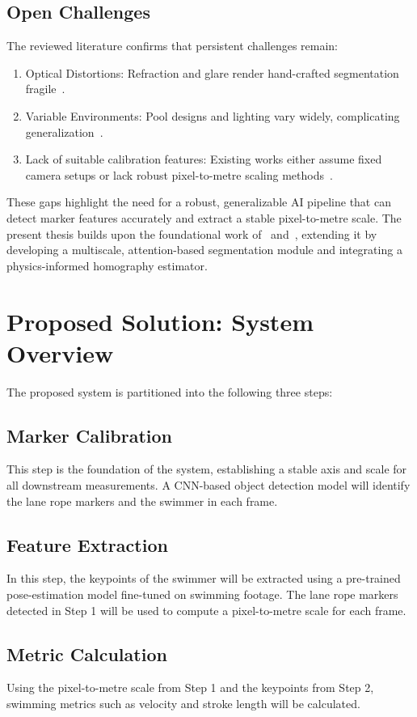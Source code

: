 \documentclass[conference]{IEEEtran}
\begin{document}
\subsection*{Open Challenges}
The reviewed literature confirms that persistent challenges remain:
\begin{enumerate}
    \item Optical Distortions: Refraction and glare render hand-crafted segmentation fragile~\cite{cao2024}.
    \item Variable Environments: Pool designs and lighting vary widely, complicating generalization~\cite{tran2024}.
    \item Lack of suitable calibration features: Existing works either assume fixed camera setups or lack robust pixel-to-metre scaling methods~\cite{tran2024, cao2024}.
\end{enumerate}

These gaps highlight the need for a robust, generalizable AI pipeline that can detect marker features accurately and extract a stable pixel-to-metre scale. The present thesis builds upon the foundational work of~\cite{tran2024} and~\cite{cao2024}, extending it by developing a multiscale, attention-based segmentation module and integrating a physics-informed homography estimator.


\section{Proposed Solution: System Overview}
The proposed system is partitioned into the following three steps:

\subsection{Marker Calibration}
This step is the foundation of the system, establishing a stable axis and scale for all downstream measurements. A CNN-based object detection model will identify the lane rope markers and the swimmer in each frame.

\subsection{Feature Extraction}
In this step, the keypoints of the swimmer will be extracted using a pre-trained pose-estimation model fine-tuned on swimming footage. The lane rope markers detected in Step 1 will be used to compute a pixel-to-metre scale for each frame.

\subsection{Metric Calculation}
Using the pixel-to-metre scale from Step 1 and the keypoints from Step 2, swimming metrics such as velocity and stroke length will be calculated. 
\end{document}
